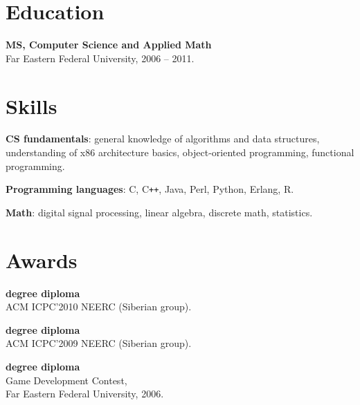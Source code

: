 \documentclass[a4paper]{article}
\begin{document}
\section{Education}
\begin{multicols}{2}
  \raggedcolumns
  \begin{items}
  \item \textbf{MS, Computer Science and Applied Math}\\
    Far Eastern Federal University, 2006 -- 2011.
  \end{items}
  \columnbreak
  \hspace{10mm}
\end{multicols}

\section{Skills}
\begin{multicols}{2}
  \raggedcolumns
  \begin{items}
  \item \textbf{CS fundamentals}: general knowledge of algorithms and
    data structures, understanding of x86 architecture basics,
    object-oriented programming, functional programming.

    \columnbreak

  \item \textbf{Programming languages}: C, C\texttt{++}, Java, Perl,
    Python, Erlang, R.
  \item \textbf{Math}: digital signal processing, linear algebra,
    discrete math, statistics.
  \end{items}
\end{multicols}

\section{Awards}
\begin{items}
  \begin{multicols}{2}
    \raggedcolumns
  \item \textbf{ degree diploma}\\ACM ICPC'2010 NEERC (Siberian group).
  \item \textbf{ degree diploma}\\ACM ICPC'2009 NEERC (Siberian group).
    \columnbreak
  \item \textbf{ degree diploma}\\Game Development Contest,\\Far Eastern Federal University, 2006.
  \end{multicols}
\end{items}
\end{document}
